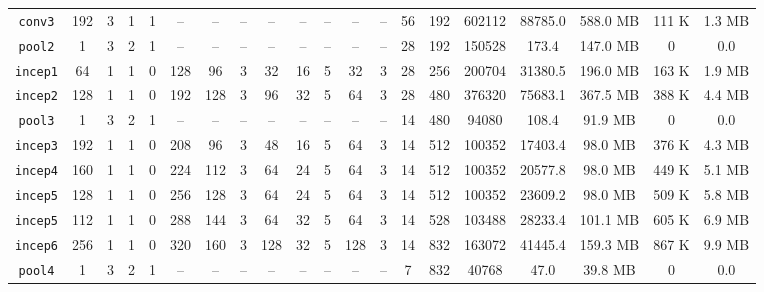 \begin{table}[H]
\begin{tabular}{cccccccccccccccccccc}
        \texttt{conv3}   & 192  & 3  & 1  & 1  & --  & --  & -- & --  & --  & -- & --  & -- & 56  & \num{192}  & \num{602112} & \num{88785.0} & \num{588.0} {\tiny MB} & \num{111} {\tiny K}  & \num{1.3} {\tiny MB}  \\
        \cmidrule(lr){1-20}
        \texttt{pool2}   & 1    & 3  & 2  & 1  & --  & --  & -- & --  & --  & -- & --  & -- & 28  & \num{192}  & \num{150528} & \num{173.4}   & \num{147.0} {\tiny MB} & \num{0}              & \num{0.0}             \\
        \texttt{incep1}  & 64   & 1  & 1  & 0  & 128 & 96  & 3  & 32  & 16  & 5  & 32  & 3  & 28  & \num{256}  & \num{200704} & \num{31380.5} & \num{196.0} {\tiny MB} & \num{163} {\tiny K}  & \num{1.9} {\tiny MB}  \\
        \texttt{incep2}  & 128  & 1  & 1  & 0  & 192 & 128 & 3  & 96  & 32  & 5  & 64  & 3  & 28  & \num{480}  & \num{376320} & \num{75683.1} & \num{367.5} {\tiny MB} & \num{388} {\tiny K}  & \num{4.4} {\tiny MB}  \\
        \texttt{pool3}   & 1    & 3  & 2  & 1  & --  & --  & -- & --  & --  & -- & --  & -- & 14  & \num{480}  & \num{94080}  & \num{108.4}   & \num{91.9} {\tiny MB}  & \num{0}              & \num{0.0}             \\
        \texttt{incep3}  & 192  & 1  & 1  & 0  & 208 & 96  & 3  & 48  & 16  & 5  & 64  & 3  & 14  & \num{512}  & \num{100352} & \num{17403.4} & \num{98.0} {\tiny MB}  & \num{376} {\tiny K}  & \num{4.3} {\tiny MB}  \\
        \texttt{incep4}  & 160  & 1  & 1  & 0  & 224 & 112 & 3  & 64  & 24  & 5  & 64  & 3  & 14  & \num{512}  & \num{100352} & \num{20577.8} & \num{98.0} {\tiny MB}  & \num{449} {\tiny K}  & \num{5.1} {\tiny MB}  \\
        \texttt{incep5}  & 128  & 1  & 1  & 0  & 256 & 128 & 3  & 64  & 24  & 5  & 64  & 3  & 14  & \num{512}  & \num{100352} & \num{23609.2} & \num{98.0} {\tiny MB}  & \num{509} {\tiny K}  & \num{5.8} {\tiny MB}  \\
        \texttt{incep5}  & 112  & 1  & 1  & 0  & 288 & 144 & 3  & 64  & 32  & 5  & 64  & 3  & 14  & \num{528}  & \num{103488} & \num{28233.4} & \num{101.1} {\tiny MB} & \num{605} {\tiny K}  & \num{6.9} {\tiny MB}  \\
        \texttt{incep6}  & 256  & 1  & 1  & 0  & 320 & 160 & 3  & 128 & 32  & 5  & 128 & 3  & 14  & \num{832}  & \num{163072} & \num{41445.4} & \num{159.3} {\tiny MB} & \num{867} {\tiny K}  & \num{9.9} {\tiny MB}  \\
        \texttt{pool4}   & 1    & 3  & 2  & 1  & --  & --  & -- & --  & --  & -- & --  & -- & 7   & \num{832}  & \num{40768}  & \num{47.0}    & \num{39.8} {\tiny MB}  & \num{0}              & \num{0.0}             \\

\end{tabular}
\end{table}
